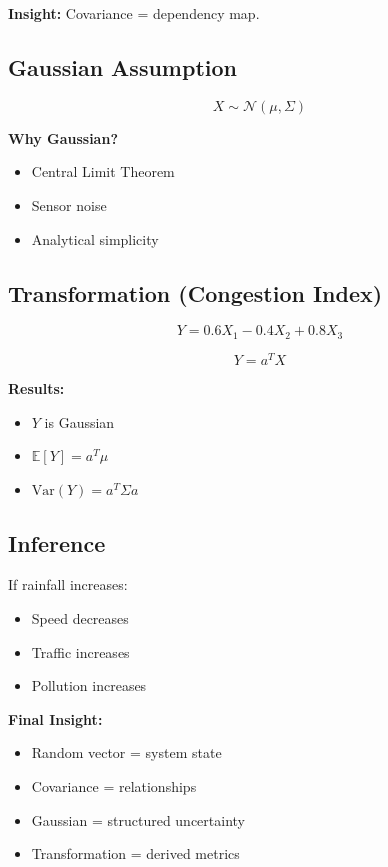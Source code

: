 \documentclass[12pt]{article}
\begin{document}
\textbf{Insight:} Covariance = dependency map.

\subsection{Gaussian Assumption}
\[
X \sim \mathcal{N}(\mu, \Sigma)
\]

\textbf{Why Gaussian?}
\begin{itemize}
    \item Central Limit Theorem
    \item Sensor noise
    \item Analytical simplicity
\end{itemize}

\subsection{Transformation (Congestion Index)}
\[
Y = 0.6X_1 - 0.4X_2 + 0.8X_3
\]

\[
Y = a^T X
\]

\textbf{Results:}
\begin{itemize}
    \item $Y$ is Gaussian
    \item $\mathbb{E}[Y] = a^T\mu$
    \item $\text{Var}(Y) = a^T \Sigma a$
\end{itemize}

\subsection{Inference}
If rainfall increases:
\begin{itemize}
    \item Speed decreases
    \item Traffic increases
    \item Pollution increases
\end{itemize}

\textbf{Final Insight:}
\begin{itemize}
    \item Random vector = system state
    \item Covariance = relationships
    \item Gaussian = structured uncertainty
    \item Transformation = derived metrics
\end{itemize}
\end{document}
